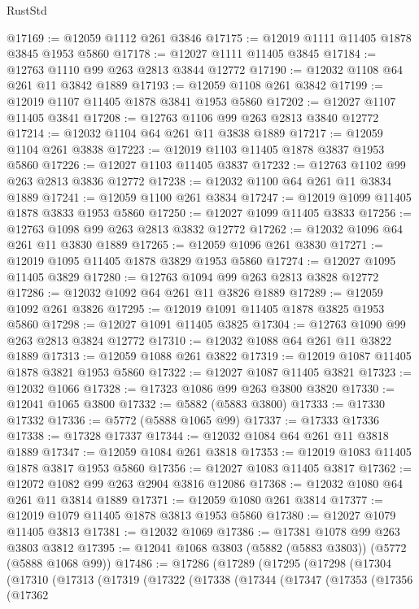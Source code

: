 \begin{lexlean}{RustStd}
\begin{coremodule}
@17169 := @12059 @1112 @261 @3846
@17175 := @12019 @1111 @11405 @1878 @3845 @1953 @5860
@17178 := @12027 @1111 @11405 @3845
@17184 := @12763 @1110 @99 @263 @2813 @3844 @12772
@17190 := @12032 @1108 @64 @261 @11 @3842 @1889
@17193 := @12059 @1108 @261 @3842
@17199 := @12019 @1107 @11405 @1878 @3841 @1953 @5860
@17202 := @12027 @1107 @11405 @3841
@17208 := @12763 @1106 @99 @263 @2813 @3840 @12772
@17214 := @12032 @1104 @64 @261 @11 @3838 @1889
@17217 := @12059 @1104 @261 @3838
@17223 := @12019 @1103 @11405 @1878 @3837 @1953 @5860
@17226 := @12027 @1103 @11405 @3837
@17232 := @12763 @1102 @99 @263 @2813 @3836 @12772
@17238 := @12032 @1100 @64 @261 @11 @3834 @1889
@17241 := @12059 @1100 @261 @3834
@17247 := @12019 @1099 @11405 @1878 @3833 @1953 @5860
@17250 := @12027 @1099 @11405 @3833
@17256 := @12763 @1098 @99 @263 @2813 @3832 @12772
@17262 := @12032 @1096 @64 @261 @11 @3830 @1889
@17265 := @12059 @1096 @261 @3830
@17271 := @12019 @1095 @11405 @1878 @3829 @1953 @5860
@17274 := @12027 @1095 @11405 @3829
@17280 := @12763 @1094 @99 @263 @2813 @3828 @12772
@17286 := @12032 @1092 @64 @261 @11 @3826 @1889
@17289 := @12059 @1092 @261 @3826
@17295 := @12019 @1091 @11405 @1878 @3825 @1953 @5860
@17298 := @12027 @1091 @11405 @3825
@17304 := @12763 @1090 @99 @263 @2813 @3824 @12772
@17310 := @12032 @1088 @64 @261 @11 @3822 @1889
@17313 := @12059 @1088 @261 @3822
@17319 := @12019 @1087 @11405 @1878 @3821 @1953 @5860
@17322 := @12027 @1087 @11405 @3821
@17323 := @12032 @1066
@17328 := @17323 @1086 @99 @263 @3800 @3820
@17330 := @12041 @1065 @3800
@17332 := @5882 (@5883 @3800)
@17333 := @17330 @17332
@17336 := @5772 (@5888 @1065 @99)
@17337 := @17333 @17336
@17338 := @17328 @17337
@17344 := @12032 @1084 @64 @261 @11 @3818 @1889
@17347 := @12059 @1084 @261 @3818
@17353 := @12019 @1083 @11405 @1878 @3817 @1953 @5860
@17356 := @12027 @1083 @11405 @3817
@17362 := @12072 @1082 @99 @263 @2904 @3816 @12086
@17368 := @12032 @1080 @64 @261 @11 @3814 @1889
@17371 := @12059 @1080 @261 @3814
@17377 := @12019 @1079 @11405 @1878 @3813 @1953 @5860
@17380 := @12027 @1079 @11405 @3813
@17381 := @12032 @1069
@17386 := @17381 @1078 @99 @263 @3803 @3812
@17395 := @12041 @1068 @3803 (@5882 (@5883 @3803)) (@5772 (@5888 @1068 @99))
@17486 := @17286
    (@17289
      (@17295
        (@17298
          (@17304
            (@17310
              (@17313
                (@17319
                  (@17322
                    (@17338
                      (@17344
                        (@17347
                          (@17353
                            (@17356
                              (@17362

\end{coremodule}
\end{lexlean}
